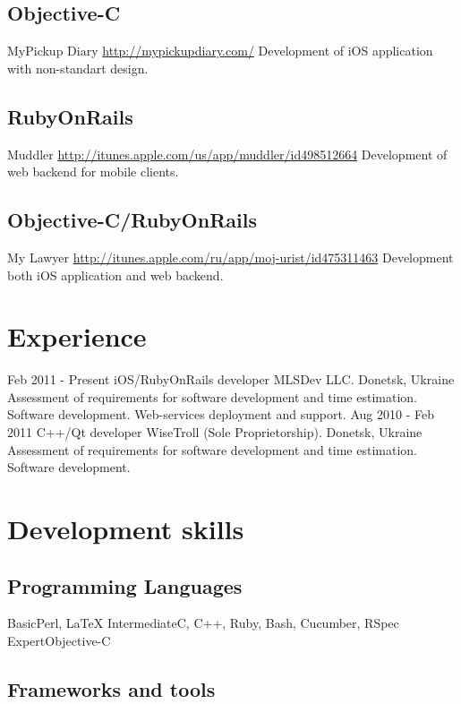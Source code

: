 \documentclass[11pt,a4paper]{moderncv}
\begin{document}
  \subsection{Objective-C}
  \cvline
    {MyPickup Diary}
    {\url{http://mypickupdiary.com/}\newline{}
    Development of iOS application with non-standart design.}
  \subsection{RubyOnRails}
  \cvline
    {Muddler}
    {\url{http://itunes.apple.com/us/app/muddler/id498512664}\newline{}
    Development of web backend for mobile clients.}
  \subsection{Objective-C/RubyOnRails}
  \cvline
    {My Lawyer}
    {\url{http://itunes.apple.com/ru/app/moj-urist/id475311463}\newline{}
    Development both iOS application and web backend.}

\section{Experience}
\cventry
  {Feb 2011 - Present}
  {iOS/RubyOnRails developer}
  {MLSDev LLC. Donetsk, Ukraine}
  {}{}
  {Assessment of requirements for software development and time estimation. 
  \newline{}Software development.
  \newline{}Web-services deployment and support.}
\cventry
  {Aug 2010 - Feb 2011}
  {C++/Qt developer}
  {WiseTroll (Sole Proprietorship). Donetsk, Ukraine}
  {}{}
  {Assessment of requirements for software development and time estimation. 
  \newline{}Software development.}


\section{Development skills}
\subsection{Programming Languages}
\cvline
  {Basic}{Perl, LaTeX}
\cvline
  {Intermediate}{C, C++, Ruby, Bash, Cucumber, RSpec}
\cvline
  {Expert}{Objective-C}
\subsection{Frameworks and tools}
\end{document}
